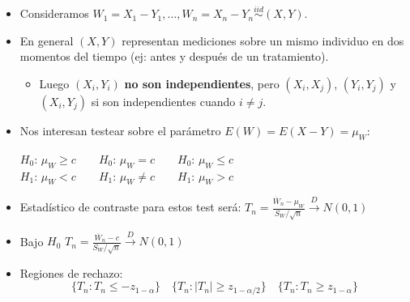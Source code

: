 \documentclass{beamer}
\theoremstyle{definition}
\begin{document}
\begin{frame}\small
\begin{itemize}
\item Consideramos $W_1=X_1-Y_1,\dots,W_n=X_n-Y_n\stackrel{iid}{\sim}(X,Y)$. \medskip %
\item En general $(X,Y)$ representan mediciones sobre un mismo individuo en dos momentos del tiempo (ej: antes y después de un tratamiento). \medskip
\begin{itemize}
    \item Luego $(X_i, Y_i)$ \textbf{no son independientes}, pero $(X_i,X_j)$,  $(Y_i,Y_j)$ y $(X_i,Y_j)$ si son independientes cuando $i\neq j$.\medskip
\end{itemize}
\item Nos interesan testear sobre el parámetro  $E(W) = E(X-Y) = \mu_W$:	\begin{center}
		$H_{0}$: $\mu_W \geq c \qquad H_{0}$: $\mu_W  = c \qquad  H_{0}$: $\mu_W \leq c $\\
$H_{1}$: $\mu_W  < c \qquad H_{1}$: $\mu_W \neq c \qquad  H_{1}$: $\mu_W > c $
			\end{center}
\item Estadístico de contraste para estos test será:
$T_n=\frac{\overline{W}_n  -\mu_W}{S_W/\sqrt{n}} \xrightarrow{D} N(0,1)$
\item Bajo $H_0$ $T_n=\frac{\overline{W}_n  -c}{S_W/\sqrt{n}} \xrightarrow{D} N(0,1)$
\item Regiones de rechazo:	
{\small
$$ \{T_n: T_n\leq -z_{1-\alpha}\} \quad \{T_n: |T_n| \geq z_{1-\alpha/2}\} \quad \{T_n: T_n\geq z_{1-\alpha}\} $$}
\end{itemize}

\end{frame}


%

\end{document}
